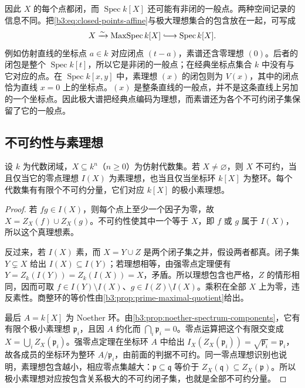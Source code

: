 因此 \(X\) 的每个点都闭，而 \(\operatorname{Spec}k[X]\) 还可能有非闭的一般点。两种空间记录的信息不同。把\eqref{b3:eq:closed-points-affine}与极大理想集合的包含放在一起，可写成
\[
	X\xrightarrow{\sim}\operatorname{MaxSpec}k[X] \lhook\joinrel\longrightarrow\operatorname{Spec}k[X].
\]
例如仿射直线的坐标点 \(a\in k\) 对应闭点 \((t-a)\)，素谱还含零理想 \((0)\)。后者的闭包是整个 \(\operatorname{Spec}k[t]\)，所以它是非闭的一般点；在经典坐标点集合 \(k\) 中没有与它对应的点。在 \(\operatorname{Spec}k[x,y]\) 中，素理想 \((x)\) 的闭包则为 \(V(x)\)，其中的闭点恰为直线 \(x=0\) 上的坐标点。\((x)\) 是整条直线的一般点，并不是这条直线上另加的一个坐标点。因此极大谱把经典点编码为理想，而素谱还为各个不可约闭子集保留了它的一般点。

\subsection{不可约性与素理想}
\label{b3:subsec:0701:02}

\begin{proposition}\label{b3:prop:affine-irreducible}
	设 \(k\) 为代数闭域，\(X\subseteq k^n\)（\(n\ge0\)）为仿射代数集。若 \(X\ne\varnothing\)，则 \(X\) 不可约，当且仅当它的零点理想 \(I(X)\) 为素理想，也当且仅当坐标环 \(k[X]\) 为整环。每个代数集有有限个不可约分量，它们对应 \(k[X]\) 的极小素理想。
\end{proposition}
\begin{proof}
	若 \(fg\in I(X)\)，则每个点上至少一个因子为零，故 \(X=Z_X(f)\cup Z_X(g)\)。不可约性使其中一个等于 \(X\)，即 \(f\) 或 \(g\) 属于 \(I(X)\)，所以这个真理想素。

	反过来，若 \(I(X)\) 素，而 \(X=Y\cup Z\) 是两个闭子集之并，假设两者都真。闭子集 \(Y\subsetneq X\) 给出 \(I(X)\subseteq I(Y)\)；若理想相等，由强零点定理便有 \(Y=Z_k(I(Y))=Z_k(I(X))=X\)，矛盾。所以理想包含也严格，\(Z\) 的情形相同，因而可取 \(f\in I(Y)\setminus I(X)\)、\(g\in I(Z)\setminus I(X)\)。乘积在全部 \(X\) 上为零，违反素性。商整环的等价性由\cref{b3:prop:prime-maximal-quotient}给出。

	最后 \(A=k[X]\) 为 Noether 环。由\cref{b3:prop:noether-spectrum-components}，它有有限个极小素理想 \(\mathfrak p_i\)，且因 \(A\) 约化而 \(\bigcap_i\mathfrak p_i=0\)。零点运算把这个有限交变成 \(X=\bigcup_i Z_X(\mathfrak p_i)\)。强零点定理在坐标环 \(A\) 中给出 \(I_X(Z_X(\mathfrak p_i))=\sqrt{\mathfrak p_i}=\mathfrak p_i\)，故各成员的坐标环为整环 \(A/\mathfrak p_i\)，由前面的判据不可约。同一零点理想识别也说明，素理想包含越小，相应零点集越大：\(\mathfrak p\subseteq\mathfrak q\) 等价于 \(Z_X(\mathfrak q)\subseteq Z_X(\mathfrak p)\)。所以极小素理想对应按包含关系极大的不可约闭子集，也就是全部不可约分量。
\end{proof}

